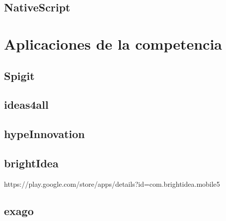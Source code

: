 \subsection{NativeScript}

\section{Aplicaciones de la competencia}
\subsection{Spigit}
\subsection{ideas4all}
\subsection{hypeInnovation}
\subsection{brightIdea}
https://play.google.com/store/apps/details?id=com.brightidea.mobile5
\subsection{exago}

